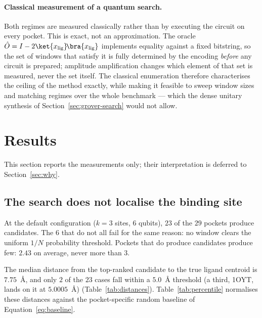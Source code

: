\paragraph{Classical measurement of a quantum search.}
Both regimes are measured classically rather than by executing the circuit on every
pocket. This is exact, not an approximation. The oracle
$\hat{O} = I - 2\ket{x_{\text{lig}}}\!\bra{x_{\text{lig}}}$ implements equality against a
fixed bitstring, so the set of windows that satisfy it is fully determined by the
encoding \emph{before} any circuit is prepared; amplitude amplification changes which
element of that set is measured, never the set itself. The classical enumeration
therefore characterises the ceiling of the method exactly, while making it feasible to
sweep window sizes and matching regimes over the whole benchmark --- which the dense
unitary synthesis of Section~\ref{sec:grover-search} would not allow.


\section{Results}
\label{sec:results}

This section reports the measurements only; their interpretation is deferred to
Section~\ref{sec:why}.

\subsection{The search does not localise the binding site}
\label{sec:res-accuracy}

At the default configuration ($k=3$ sites, $6$ qubits), $23$ of the $29$ pockets produce
candidates. The $6$ that do not all fail for the same reason: no window clears the
uniform $1/N$ probability threshold. Pockets that do produce candidates produce few:
$2.43$ on average, never more than $3$.

The median distance from the top-ranked candidate to the true ligand centroid is
$7.75$~\AA{}, and only $2$ of the $23$ cases fall within a $5.0$~\AA{} threshold
(a third, 1OYT, lands on it at $5.0005$~\AA{})
(Table~\ref{tab:distances}). Table~\ref{tab:percentile} normalises these distances
against the pocket-specific random baseline of Equation~\eqref{eq:baseline}.

